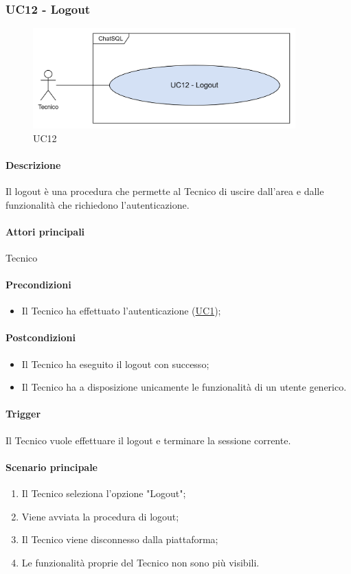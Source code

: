 \subsubsection{UC12 - Logout}\label{UC12}

\begin{figure}[H]
  \centering
  \includegraphics[width=0.90\textwidth]{assets/uc12.png}
  \caption{UC12}
\end{figure}

\paragraph*{Descrizione}
Il logout è una procedura che permette al Tecnico di uscire dall'area e dalle funzionalità che richiedono l'autenticazione.


\paragraph*{Attori principali}
Tecnico

\paragraph*{Precondizioni}
\begin{itemize}
  \item Il Tecnico ha effettuato l'autenticazione (\hyperref[UC1]{UC1});
\end{itemize}

\paragraph*{Postcondizioni}
\begin{itemize}
  \item Il Tecnico ha eseguito il logout con successo;
  \item Il Tecnico ha a disposizione unicamente le funzionalità di un utente generico.
\end{itemize}

\paragraph*{Trigger}
Il Tecnico vuole effettuare il logout e terminare la sessione corrente.

\paragraph*{Scenario principale}
\begin{enumerate}
  \item Il Tecnico seleziona l'opzione "Logout";
  \item Viene avviata la procedura di logout;
  \item Il Tecnico viene disconnesso dalla piattaforma;
  \item Le funzionalità proprie del Tecnico non sono più visibili.
\end{enumerate}